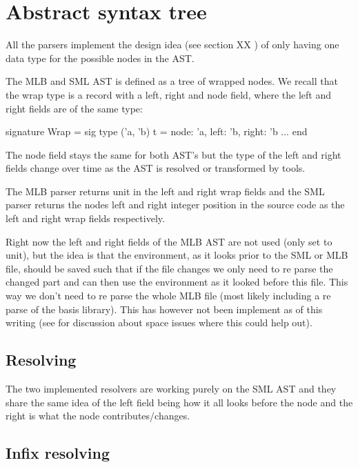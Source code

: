 \section{Abstract syntax tree}

All the parsers implement the design idea (see section XX )
of only having one data type for the possible nodes in the AST. 

The MLB and SML AST is defined as a tree of wrapped nodes. We recall that the
wrap type is a record with a left, right and node field, where the left and
right fields are of the same type:

\begin{sml}
signature Wrap =
sig
  type ('a, 'b) t = {node: 'a, left: 'b, right: 'b}
  ...
end
\end{sml}

The node field stays the same for both AST's but the type of the left and right
fields change over time as the AST is resolved or transformed by tools.

The MLB parser returns unit in the left and right wrap fields and the SML parser
returns the nodes left and right integer position in the source code as the left
and right wrap fields respectively.

Right now the left and right fields of the MLB AST are not used (only set to
unit), but the idea is that the environment, as it looks prior to the SML or MLB
file, should be saved such that if the file changes we only need to re parse the
changed part and can then use the environment as it looked before this
file. This way we don't need to re parse the whole MLB file (most likely
including a re parse of the basis library). This has however not been implement
as of this writing (see  for discussion about space issues
where this could help out).

\subsection{Resolving}

The two implemented resolvers are working purely on the SML AST and they share
the same idea of the left field being how it all looks before the node and the
right is what the node contributes/changes.

\subsection{Infix resolving}

